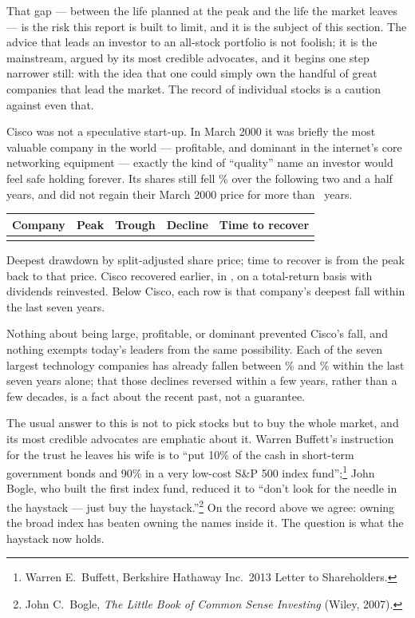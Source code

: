 \documentclass[11pt]{article}
\begin{document}
That gap --- between the life planned at the peak and the life the market leaves --- is the risk this
report is built to limit, and it is the subject of this section. The advice that leads an investor to an
all-stock portfolio is not foolish; it is the mainstream, argued by its most credible advocates, and it
begins one step narrower still: with the idea that one could simply own the handful of great companies
that lead the market. The record of individual stocks is a caution against even that.

Cisco was not a speculative start-up. In March 2000 it was briefly the most valuable company in the
world --- profitable, and dominant in the internet's core networking equipment --- exactly the kind of
``quality'' name an investor would feel safe holding forever. Its shares still fell \CiscoDecline\% over
the following two and a half years, and did not regain their March 2000 price for more than
\CiscoRecoverYears\ years.

{\small
\begin{center}
\begin{tabular}{@{}lcccr@{}}
\toprule
Company & Peak & Trough & Decline & Time to recover \\
\midrule
\\
\bottomrule
\end{tabular}
\end{center}
}
\noindent\footnotesize Deepest drawdown by split-adjusted share price; time to recover is from the peak
back to that price. Cisco recovered earlier, in \CiscoTRRecoverYear, on a total-return basis with
dividends reinvested. Below Cisco, each row is that company's deepest fall within the last seven
years.\normalsize

\medskip
Nothing about being large, profitable, or dominant prevented Cisco's fall, and nothing exempts today's
leaders from the same possibility. Each of the seven largest technology companies has already fallen
between \BigTechMinDecline\% and \BigTechMaxDecline\% within the last seven years alone; that those
declines reversed within a few years, rather than a few decades, is a fact about the recent past, not a
guarantee.

The usual answer to this is not to pick stocks but to buy the whole market, and its most credible
advocates are emphatic about it. Warren Buffett's instruction for the trust he leaves his wife is to
``put 10\% of the cash in short-term government bonds and 90\% in a very low-cost S\&P 500 index
fund'';\footnote{Warren E.\ Buffett, Berkshire Hathaway Inc.\ 2013 Letter to Shareholders.} John Bogle,
who built the first index fund, reduced it to ``don't look for the needle in the haystack --- just buy
the haystack.''\footnote{John C.\ Bogle, \emph{The Little Book of Common Sense Investing} (Wiley, 2007).}
On the record above we agree: owning the broad index has beaten owning the names inside it. The question
is what the haystack now holds.
\end{document}
